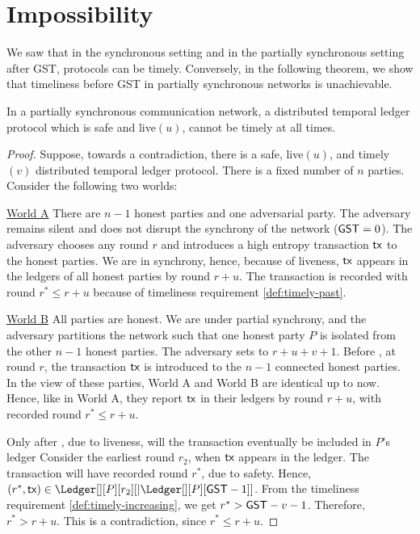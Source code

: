 \section{Impossibility}\label{sec:impossibility}

We saw that in the synchronous setting and in the partially synchronous setting after GST,
protocols can be timely.
Conversely, in the following theorem, we show that timeliness before GST in partially
synchronous networks is unachievable.

\begin{theorem}
  In a partially synchronous communication network, a distributed temporal ledger protocol
  which is safe and live$(u)$, cannot be timely at all times.
\end{theorem}
\begin{proof}
  Suppose, towards a contradiction, there is a safe, live$(u)$, and timely$(v)$ distributed temporal ledger protocol.
  There is a fixed number of $n$ parties.
  Consider the following two worlds:

  \noindent
  \underline{World A}
  There are $n-1$ honest parties and one adversarial party. The adversary remains silent and
  does not disrupt the synchrony of the network ($\textsf{GST} = 0$).
  The adversary chooses any round $r$ and introduces a high entropy transaction $\textsf{tx}$ to the honest parties. We are in
  synchrony, hence, because of liveness, $\textsf{tx}$ appears in the ledgers of all honest parties
  by round $r + u$. The transaction is recorded with round $r^* \leq r + u$ because of
  timeliness requirement \ref{def:timely-past}.

  \noindent
  \underline{World B}
  All parties are honest. We are under partial synchrony, and the adversary partitions the network such that
  one honest party $P$ is isolated from the other $n-1$ honest parties.
  The adversary sets \gst to  $r + u + v + 1$.
  Before \gst, at round $r$, the transaction $\textsf{tx}$ is introduced to the $n-1$ connected
  honest parties. In the view of these parties,
  World A and World B are identical up to now. Hence, like in World A,
  they report $\textsf{tx}$ in their ledgers by round $r + u$, with recorded round $r^* \leq r + u$.

  Only after \gst, due to liveness, will the transaction eventually be included in $P$'s ledger
  Consider the earliest round $r_2$, when $\textsf{tx}$ appears in the ledger.
  The transaction will have recorded round $r^*$, due to safety.
  Hence, $(r^*, \tx) \in \Ledger[][P][r_2][|\Ledger[][P][\gst - 1]]$.
  From the timeliness requirement \ref{def:timely-increasing}, we
  get $r^* > \textsf{GST} - v - 1$. Therefore, $r^* > r + u$.
  This is a contradiction, since $r^* \leq r + u$.
  \Qed
\end{proof}
